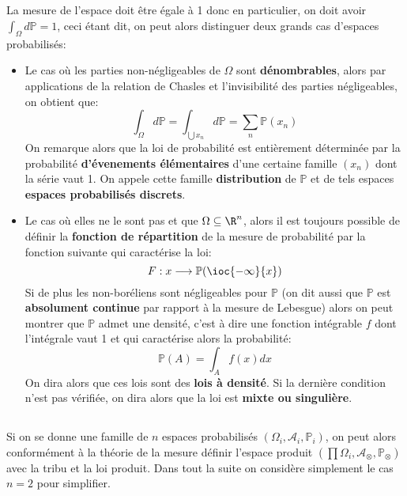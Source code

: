 \subsection*{}
La mesure de l'espace doit être égale à 1 donc en particulier, on doit avoir \( \int_ \Omega d \mathbb{P} = 1 \), ceci étant dit, on peut alors distinguer deux grands cas d'espaces probabilisés:
\begin{itemize}
   \item Le cas où les parties non-négligeables de \( \Omega \) sont \textbf{dénombrables}, alors par applications de la relation de Chasles et l'invisibilité des parties négligeables, on obtient que:
   \[ 
      \int_\Omega d \mathbb{P} = \int_{\bigcup x_n} d \mathbb{P} = \sum_n \mathbb{P}(x_n)
   \]
   On remarque alors que la loi de probabilité est entièrement déterminée par la probabilité \textbf{d'évenements élémentaires} d'une certaine famille \( (x_n) \) dont la série vaut 1. On appele cette famille \textbf{distribution} de \( \mathbb{P} \) et de tels espaces \textbf{espaces probabilisés discrets}.
   \item Le cas où elles ne le sont pas et que \( \Omega \subseteq \R^n \), alors il est toujours possible de définir la \textbf{fonction de répartition} de la mesure de probabilité par la fonction suivante qui caractérise la loi:
   \[ 
      F : x \longrightarrow \mathbb{P}(\ioc{-\infty}{x})
   \]
   Si de plus les non-boréliens sont négligeables pour \( \mathbb{P} \) (on dit aussi que \( \mathbb{P} \) est \textbf{absolument continue} par rapport à la mesure de Lebesgue) alors on peut montrer que \( \mathbb{P} \) admet une densité, c'est à dire une fonction intégrable \( f \) dont l'intégrale vaut 1 et qui caractérise alors la probabilité:
   \[ 
      \mathbb{P}(A) = \int_A f(x)dx 
   \]
   On dira alors que ces lois sont des \textbf{lois à densité}. Si la dernière condition n'est pas vérifiée, on dira alors que la loi est \textbf{mixte ou singulière}.
\end{itemize}
\subsection*{}
Si on se donne une famille de \( n \) espaces probabilisés \( ( \Omega_i, \mathscr{A}_i, \mathbb{P}_i) \), on peut alors conformément à la théorie de la mesure définir l'espace produit \( ( \prod \Omega_i, \mathscr{A}_\otimes, \mathbb{P}_\otimes ) \) avec la tribu et la loi produit. Dans tout la suite on considère simplement le cas \( n=2 \) pour simplifier.

